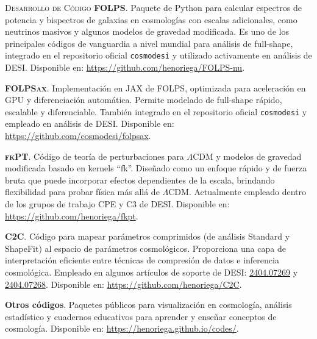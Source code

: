 \begin{rubric}{\faCode \textsc{Desarrollo de Código}}
\entry*[]
	\textbf{FOLPS}. Paquete de Python para calcular espectros de potencia y bispectros de galaxias en cosmologías con escalas adicionales, como neutrinos masivos y algunos modelos de gravedad modificada. Es uno de los principales códigos de vanguardia a nivel mundial para análisis de full-shape, integrado en el repositorio oficial \texttt{cosmodesi} y utilizado activamente en análisis de DESI. Disponible en: \url{https://github.com/henoriega/FOLPS-nu}.
    
\entry*[]
	  \textbf{\textsc{FOLPSax}}. Implementación en JAX de FOLPS, optimizada para aceleración en GPU y diferenciación automática. Permite modelado de full-shape rápido, escalable y diferenciable. También integrado en el repositorio oficial \texttt{cosmodesi} y empleado en análisis de DESI. Disponible en: \url{https://github.com/cosmodesi/folpsax}.

\entry*[]
	  \textbf{\textsc{fkPT}}. Código de teoría de perturbaciones para $\Lambda$CDM y modelos de gravedad modificada basado en kernels “fk”. Diseñado como un enfoque rápido y de fuerza bruta que puede incorporar efectos dependientes de la escala, brindando flexibilidad para probar física más allá de $\Lambda$CDM. Actualmente empleado dentro de los grupos de trabajo CPE y C3 de DESI. Disponible en: \url{https://github.com/henoriega/fkpt}.


\entry*[]
    \textbf{C2C}. Código para mapear parámetros comprimidos (de análisis Standard y ShapeFit) al espacio de parámetros cosmológicos. Proporciona una capa de interpretación eficiente entre técnicas de compresión de datos e inferencia cosmológica. Empleado en algunos artículos de soporte de DESI: \href{https://arxiv.org/abs/2404.07269}{2404.07269} y \href{https://arxiv.org/abs/2404.07268}{2404.07268}. Disponible en: \url{https://github.com/henoriega/C2C}.

\entry*[]
	  \textbf{Otros códigos}. Paquetes públicos para visualización en cosmología, análisis estadístico y cuadernos educativos para aprender y enseñar conceptos de cosmología. Disponible en: \url{https://henoriega.github.io/codes/}.
\end{rubric}

